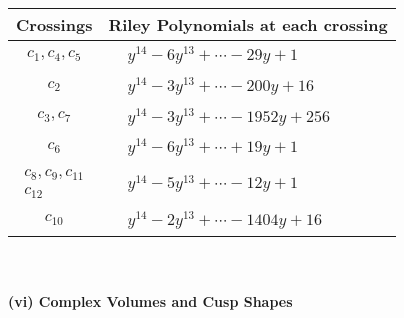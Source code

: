 \documentclass[1p]{elsarticle_modified}
\theoremstyle{definition}
\begin{document}
\begin{tabular}{m{50pt}|m{274pt}}
Crossings & \hspace{64pt}Riley Polynomials at each crossing \\
\hline $$\begin{aligned}c_{1},c_{4},c_{5}\end{aligned}$$&$\begin{aligned}
&y^{14}-6 y^{13}+\cdots-29 y+1
\end{aligned}$\\
\hline $$\begin{aligned}c_{2}\end{aligned}$$&$\begin{aligned}
&y^{14}-3 y^{13}+\cdots-200 y+16
\end{aligned}$\\
\hline $$\begin{aligned}c_{3},c_{7}\end{aligned}$$&$\begin{aligned}
&y^{14}-3 y^{13}+\cdots-1952 y+256
\end{aligned}$\\
\hline $$\begin{aligned}c_{6}\end{aligned}$$&$\begin{aligned}
&y^{14}-6 y^{13}+\cdots+19 y+1
\end{aligned}$\\
\hline $$\begin{aligned}c_{8},c_{9},c_{11}\\c_{12}\end{aligned}$$&$\begin{aligned}
&y^{14}-5 y^{13}+\cdots-12 y+1
\end{aligned}$\\
\hline $$\begin{aligned}c_{10}\end{aligned}$$&$\begin{aligned}
&y^{14}-2 y^{13}+\cdots-1404 y+16
\end{aligned}$\\
\hline
\end{tabular}\\~\\
\newpage\flushleft \textbf{(vi) Complex Volumes and Cusp Shapes}
\end{document}
